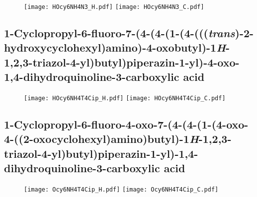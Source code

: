\begin{figure}[H]
	\centering
		\texttt{[image: HOcy6NH4N3\_H.pdf]}
		\texttt{[image: HOcy6NH4N3\_C.pdf]}
\end{figure}



\subsection{1\hyp{}Cyclopropyl\hyp{}6\hyp{}fluoro\hyp{}7\hyp{}(4\hyp{}(4\hyp{}(1\hyp{}(4\hyp{}(((\textit{trans})\hyp{}2\hyp{}hydroxycyclohexyl)amino)\hyp{}4\hyp{}oxobutyl)\hyp{}1\textit{H}\hyp{}1,2,3\hyp{}triazol\hyp{}4\hyp{}yl)butyl)piperazin\hyp{}1\hyp{}yl)\hyp{}4\hyp{}oxo\hyp{}1,4\hyp{}dihydroquinoline\hyp{}3\hyp{}carboxylic acid }

\begin{figure}[H]
	\centering
		\texttt{[image: HOcy6NH4T4Cip\_H.pdf]}
		\texttt{[image: HOcy6NH4T4Cip\_C.pdf]}
\end{figure}

\subsection{1\hyp{}Cyclopropyl\hyp{}6\hyp{}fluoro\hyp{}4\hyp{}oxo\hyp{}7\hyp{}(4\hyp{}(4\hyp{}(1\hyp{}(4\hyp{}oxo\hyp{}4\hyp{}((2\hyp{}oxocyclohexyl)amino)but\allowbreak yl)\hyp{}1\textit{H}\hyp{}1,2,3\hyp{}triazol\hyp{}4\hyp{}yl)butyl)piperazin\hyp{}1\hyp{}yl)\hyp{}1,4\hyp{}dihydroquinoline\hyp{}3\hyp{}carboxy\allowbreak lic acid }

\begin{figure}[H]
	\centering
		\texttt{[image: Ocy6NH4T4Cip\_H.pdf]}
		\texttt{[image: Ocy6NH4T4Cip\_C.pdf]}
\end{figure}
